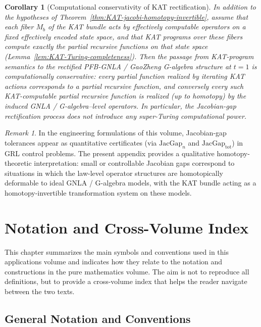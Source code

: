 \documentclass[11pt]{book}
\theoremstyle{plain}
\newtheorem{corollary}[theorem]{Corollary}
\theoremstyle{definition}
\theoremstyle{remark}
\newtheorem{remark}[theorem]{Remark}
\begin{document}
\begin{corollary}[Computational conservativity of KAT rectification]\label{cor:KAT-computational-conservativity}
In addition to the hypotheses of
Theorem~\ref{thm:KAT-jacobi-homotopy-invertible}, assume that each
fiber $M_b$ of the KAT bundle acts by effectively computable operators
on a fixed effectively encoded state space, and that KAT programs over
these fibers compute exactly the partial recursive functions on that
state space (Lemma~\ref{lem:KAT-Turing-completeness}). Then the passage
from KAT-program semantics to the rectified PFB-GNLA / GaoZheng
G-algebra structure at $t=1$ is computationally conservative: every
partial function realized by iterating KAT actions corresponds to a
partial recursive function, and conversely every such KAT-computable
partial recursive function is realized (up to homotopy) by the induced
GNLA / G-algebra--level operators. In particular, the Jacobian-gap
rectification process does not introduce any super-Turing computational
power.
\end{corollary}

\begin{remark}
In the engineering formulations of this volume, Jacobian-gap
tolerances appear as quantitative certificates (via
$\mathrm{JacGap}_n$ and $\mathrm{JacGap}_{\mathrm{tot}}$) in GRL
control problems. The present appendix provides a qualitative
homotopy-theoretic interpretation: small or controllable Jacobian
gaps correspond to situations in which the law-level operator
structures are homotopically deformable to ideal GNLA / G-algebra
models, with the KAT bundle acting as a homotopy-invertible
transformation system on these models.
\end{remark}

\chapter{Notation and Cross-Volume Index}
\label{chap:notation-cross-volume}


This chapter summarizes the main symbols and conventions used in
this applications volume and indicates how they relate to the
notation and constructions in the pure mathematics volume\cite{GaoZheng2025GFramework}.
The aim is not to reproduce all definitions, but to provide a
cross-volume index that helps the reader navigate between the two
texts.

\section*{General Notation and Conventions}
\end{document}
